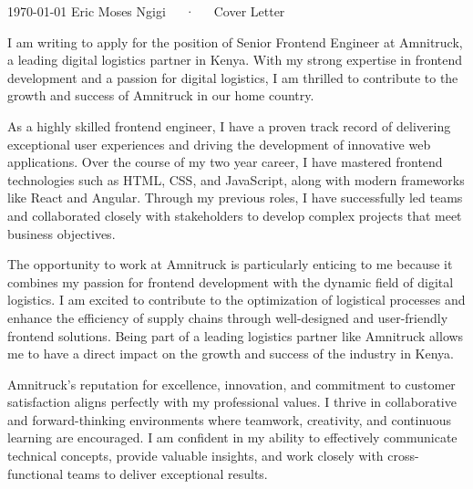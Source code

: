 \documentclass[11pt, a4paper]{configuration}
\begin{document}
\makecvheader[C]

\makecvfooter
  {\today}
  {Eric Moses Ngigi~~~·~~~Cover Letter}
  {}

\makelettertitle

\begin{cvletter}

I am writing to apply for the position of Senior Frontend Engineer at Amnitruck, a leading digital logistics partner in Kenya. With my strong expertise in frontend development and a passion for digital logistics, I am thrilled to contribute to the growth and success of Amnitruck in our home country.

As a highly skilled frontend engineer, I have a proven track record of delivering exceptional user experiences and driving the development of innovative web applications. Over the course of my two year career, I have mastered frontend technologies such as HTML, CSS, and JavaScript, along with modern frameworks like React and Angular. Through my previous roles, I have successfully led teams and collaborated closely with stakeholders to develop complex projects that meet business objectives.

The opportunity to work at Amnitruck is particularly enticing to me because it combines my passion for frontend development with the dynamic field of digital logistics. I am excited to contribute to the optimization of logistical processes and enhance the efficiency of supply chains through well-designed and user-friendly frontend solutions. Being part of a leading logistics partner like Amnitruck allows me to have a direct impact on the growth and success of the industry in Kenya.

Amnitruck's reputation for excellence, innovation, and commitment to customer satisfaction aligns perfectly with my professional values. I thrive in collaborative and forward-thinking environments where teamwork, creativity, and continuous learning are encouraged. I am confident in my ability to effectively communicate technical concepts, provide valuable insights, and work closely with cross-functional teams to deliver exceptional results.


\end{cvletter}
\end{document}
